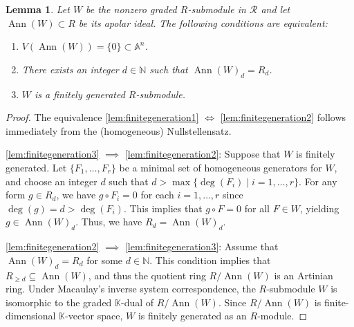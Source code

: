 \documentclass[a4paper, 11pt]{amsart}
\numberwithin{theorem}{section}
\newtheorem{lemma}[theorem]{Lemma}
\theoremstyle{definition}
\numberwithin{equation}{section}
\DeclareMathOperator{\Ann}{\operatorname{Ann}}
\begin{document}
\begin{lemma}\label{lem:finitegeneration}
Let $W$ be the nonzero graded $R$-submodule in $\mathcal{R}$ and let $\Ann(W) \subset R$ be its apolar ideal. 
The following conditions are equivalent:
\begin{enumerate}
    \item\label{lem:finitegeneration1} $V(\Ann(W)) = \{0\} \subset \mathbb{A}^n$.
    \item\label{lem:finitegeneration2} There exists an integer $d \in \mathbb{N}$ such that $\Ann(W)_d = R_d$.
    \item\label{lem:finitegeneration3} $W$ is a finitely generated $R$-submodule.
\end{enumerate}
\end{lemma}

\begin{proof}
The equivalence \eqref{lem:finitegeneration1} $\iff$ \eqref{lem:finitegeneration2} follows immediately from the (homogeneous) Nullstellensatz.

\medskip
\noindent \eqref{lem:finitegeneration3} $\implies$ \eqref{lem:finitegeneration2}: Suppose that $W$ is finitely generated. 
Let $\{F_1, \dots, F_r\}$ be a minimal set of homogeneous generators for $W$, and choose an integer $d$ such that $d > \max\{\deg(F_i) \mid i = 1, \dots, r\}$. 
For any form $g \in R_d$, we have $g \circ F_i = 0$ for each $i = 1, \dots, r$ since $\deg(g) = d > \deg(F_i)$. 
This implies that $g \circ F = 0$ for all $F \in W$, yielding $g \in \Ann(W)_d$. 
Thus, we have $R_d = \Ann(W)_d$.

\medskip
\noindent \eqref{lem:finitegeneration2} $\implies$ \eqref{lem:finitegeneration3}: 
Assume that $\Ann(W)_d = R_d$ for some $d \in \mathbb{N}$. 
This condition implies that $R_{\geq d} \subseteq \Ann(W)$, and thus the quotient ring $R/\Ann(W)$ is an Artinian ring. 
Under Macaulay's inverse system correspondence, the $R$-submodule $W$ is isomorphic to the graded $\mathbb{K}$-dual of $R/\Ann(W)$. 
Since $R/\Ann(W)$ is finite-dimensional $\mathbb{K}$-vector space, $W$ is finitely generated as an $R$-module.
\end{proof}
\end{document}
